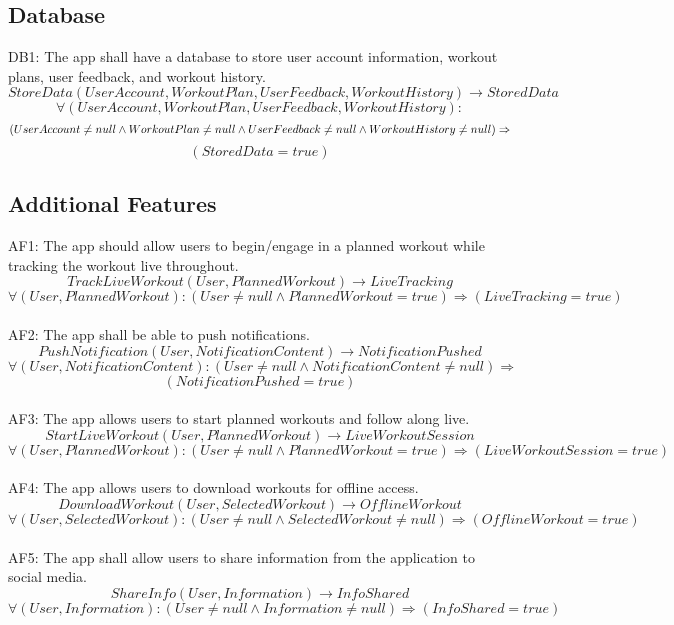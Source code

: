 \documentclass[12pt]{article}
\begin{document}
\subsection{Database}
DB1: The app shall have a database to store user account information, workout plans, user feedback, and workout history.
\[StoreData(UserAccount, WorkoutPlan, UserFeedback, WorkoutHistory) \rightarrow StoredData \]
\[ \forall (UserAccount, WorkoutPlan, UserFeedback, WorkoutHistory):\] 
\[(UserAccount \neq null \land WorkoutPlan \neq null \land UserFeedback \neq null \land WorkoutHistory \neq null) \\
\Rightarrow\] \[(StoredData = true) \]

\subsection{Additional Features}
AF1: The app should allow users to begin/engage in a planned workout while tracking the workout live throughout.
\[TrackLiveWorkout(User, PlannedWorkout) \rightarrow LiveTracking \]
\[ \forall (User, PlannedWorkout): (User \neq null \land PlannedWorkout = true) \Rightarrow (LiveTracking = true) \]\\

AF2: The app shall be able to push notifications.
\[PushNotification(User, NotificationContent) \rightarrow NotificationPushed \]
\[ \forall (User, NotificationContent): (User \neq null \land NotificationContent \neq null) \Rightarrow\] \[(NotificationPushed = true) \]\\

AF3: The app allows users to start planned workouts and follow along live.
\[StartLiveWorkout(User, PlannedWorkout) \rightarrow LiveWorkoutSession \]
\[ \forall (User, PlannedWorkout): (User \neq null \land PlannedWorkout = true) \Rightarrow (LiveWorkoutSession = true) \]\\

AF4: The app allows users to download workouts for offline access.
\[DownloadWorkout(User, SelectedWorkout) \rightarrow OfflineWorkout \]
\[ \forall (User, SelectedWorkout): (User \neq null \land SelectedWorkout \neq null) \Rightarrow (OfflineWorkout = true) \]\\

AF5: The app shall allow users to share information from the application to social media.
\[ShareInfo(User, Information) \rightarrow InfoShared \]
\[ \forall (User, Information): (User \neq null \land Information \neq null) \Rightarrow (InfoShared = true) \]
\end{document}

